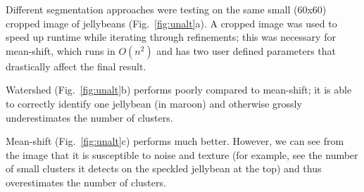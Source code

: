 \documentclass[12pt]{article}
\begin{document}
Different segmentation approaches were testing on the same small (60x60) cropped image of jellybeans (Fig.~\ref{fig:unalt}a). A cropped image was used to speed up runtime while iterating through refinements; this was necessary for mean-shift, which runs in \(O(n^2)\) and has two user defined parameters that drastically affect the final result.

Watershed (Fig.~\ref{fig:unalt}b) performs poorly compared to mean-shift; it is able to correctly identify one jellybean (in maroon) and otherwise grossly underestimates the number of clusters.

Mean-shift (Fig.~\ref{fig:unalt}c) performs much better. However, we can see from the image that it is susceptible to noise and texture (for example, see the number of small clusters it detects on the speckled jellybean at the top) and thus overestimates the number of clusters.
\end{document}

